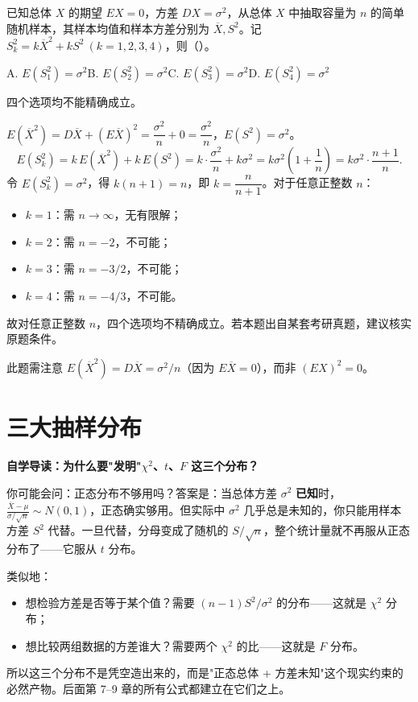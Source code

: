 ﻿\documentclass[lang=cn,11pt]{elegantbook}
\begin{document}
\begin{exercise}\label{exer:6-sk-sq}
已知总体 \(X\) 的期望 \(EX = 0\)，方差 \(DX = \sigma^2\)，从总体 \(X\) 中抽取容量为 \(n\) 的简单随机样本，其样本均值和样本方差分别为 \(\overline{X}, S^2\)。记 \(S_k^2 = k\overline{X}^2 + kS^2\ (k=1,2,3,4)\)，则（\quad）。\par
A. \(E(S_1^2) = \sigma^2\)\quad B. \(E(S_2^2) = \sigma^2\)\quad C. \(E(S_3^2) = \sigma^2\)\quad D. \(E(S_4^2) = \sigma^2\)
\end{exercise}

\begin{solution}
四个选项均不能精确成立。

\(E(\overline{X}^2) = D\overline{X} + (E\overline{X})^2 = \dfrac{\sigma^2}{n} + 0 = \dfrac{\sigma^2}{n}\)，\(E(S^2) = \sigma^2\)。
\[
E(S_k^2) = k\,E(\overline{X}^2) + k\,E(S^2) = k \cdot \frac{\sigma^2}{n} + k\sigma^2 = k\sigma^2\!\left(1+\frac{1}{n}\right) = k\sigma^2 \cdot \frac{n+1}{n}.
\]
令 \(E(S_k^2) = \sigma^2\)，得 \(k(n+1) = n\)，即 \(k = \dfrac{n}{n+1}\)。对于任意正整数 \(n\)：
\begin{itemize}
    \item \(k=1\)：需 \(n\to\infty\)，无有限解；
    \item \(k=2\)：需 \(n=-2\)，不可能；
    \item \(k=3\)：需 \(n=-3/2\)，不可能；
    \item \(k=4\)：需 \(n=-4/3\)，不可能。
\end{itemize}
故对任意正整数 \(n\)，四个选项均不精确成立。若本题出自某套考研真题，建议核实原题条件。
\begin{note}
此题需注意 \(E(\overline{X}^2) = D\overline{X} = \sigma^2/n\)（因为 \(E\overline{X}=0\)），而非 \((EX)^2=0\)。
\end{note}
\end{solution}


\section{三大抽样分布}

\begin{note}
\textbf{自学导读：为什么要"发明"$\chi^2$、$t$、$F$ 这三个分布？}

你可能会问：正态分布不够用吗？答案是：当总体方差 $\sigma^2$ \textbf{已知}时，$\frac{\bar{X}-\mu}{\sigma/\sqrt{n}}\sim N(0,1)$，正态确实够用。但实际中 $\sigma^2$ 几乎总是未知的，你只能用样本方差 $S^2$ 代替。一旦代替，分母变成了随机的 $S/\sqrt{n}$，整个统计量就不再服从正态分布了——它服从 $t$ 分布。

类似地：
\begin{itemize}
    \item 想检验方差是否等于某个值？需要 $(n-1)S^2/\sigma^2$ 的分布——这就是 $\chi^2$ 分布；
    \item 想比较两组数据的方差谁大？需要两个 $\chi^2$ 的比——这就是 $F$ 分布。
\end{itemize}

所以这三个分布不是凭空造出来的，而是"正态总体 + 方差未知"这个现实约束的必然产物。后面第 7--9 章的所有公式都建立在它们之上。
\end{note}
\end{document}
